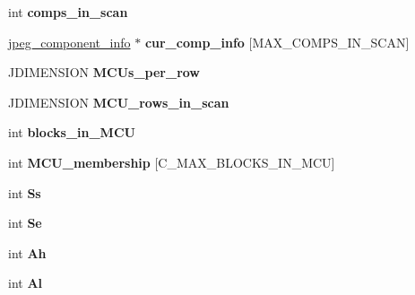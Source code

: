 \begin{DoxyCompactItemize}
int {\bfseries comps\+\_\+in\+\_\+scan}
\item 
\mbox{\label{structjpeg__compress__struct_aa2f0bf5dff97a2676995b34140793825}} 
\hyperlink{structjpeg__component__info}{jpeg\+\_\+component\+\_\+info} $\ast$ {\bfseries cur\+\_\+comp\+\_\+info} \mbox{[}M\+A\+X\+\_\+\+C\+O\+M\+P\+S\+\_\+\+I\+N\+\_\+\+S\+C\+AN\mbox{]}
\item 
\mbox{\label{structjpeg__compress__struct_a4bf94c89145c48b582a27eb183d96f9d}} 
J\+D\+I\+M\+E\+N\+S\+I\+ON {\bfseries M\+C\+Us\+\_\+per\+\_\+row}
\item 
\mbox{\label{structjpeg__compress__struct_ad9d524904177bde3e1e9c515af882552}} 
J\+D\+I\+M\+E\+N\+S\+I\+ON {\bfseries M\+C\+U\+\_\+rows\+\_\+in\+\_\+scan}
\item 
\mbox{\label{structjpeg__compress__struct_a9a566432e939703e277a38a9cc9c60f4}} 
int {\bfseries blocks\+\_\+in\+\_\+\+M\+CU}
\item 
\mbox{\label{structjpeg__compress__struct_ac0cb87d326614390fb164842781beba1}} 
int {\bfseries M\+C\+U\+\_\+membership} \mbox{[}C\+\_\+\+M\+A\+X\+\_\+\+B\+L\+O\+C\+K\+S\+\_\+\+I\+N\+\_\+\+M\+CU\mbox{]}
\item 
\mbox{\label{structjpeg__compress__struct_ab260a491c6fc19739138894ab7deff0d}} 
int {\bfseries Ss}
\item 
\mbox{\label{structjpeg__compress__struct_aa48ad5a8248eacc3a1e32f83d8e042ad}} 
int {\bfseries Se}
\item 
\mbox{\label{structjpeg__compress__struct_a0ce329c8f2fc5df5afd401632623c4a5}} 
int {\bfseries Ah}
\item 
\mbox{\label{structjpeg__compress__struct_a1e16717d692de3473ea3bb49a75fbb60}} 
int {\bfseries Al}
\item 
\mbox{\label{structjpeg__compress__struct_a70b27761c7d0bd5cd90f4fe47e569b94}} 

\end{DoxyCompactItemize}
